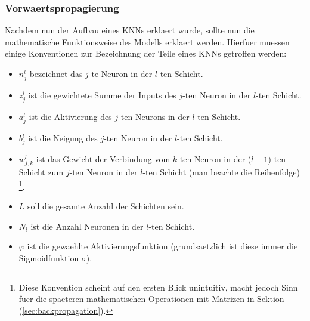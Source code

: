 \documentclass[../main]{subfiles}
\begin{document}
\subsubsection{Vorwaertspropagierung}
Nachdem nun der Aufbau eines KNNs erklaert wurde, sollte nun die mathematische Funktionsweise
des Modells erklaert werden. Hierfuer muessen einige Konventionen zur
Bezeichnung der Teile eines KNNs getroffen werden:

\begin{itemize}

\item{$n_j^l$ bezeichnet das $j$-te Neuron in der $l$-ten Schicht.}
\item{$z_j^l$ ist die gewichtete Summe der Inputs des $j$-ten Neuron in der $l$-ten Schicht.}
\item{$a_j^l$ ist die Aktivierung des $j$-ten Neurons in der $l$-ten Schicht.}
\item{$b_j^l$ ist die Neigung des $j$-ten Neuron in der $l$-ten Schicht.}
\item{$w_{j,k}^l$ ist das Gewicht der Verbindung vom $k$-ten Neuron
    in der ($l-1$)-ten Schicht zum $j$-ten Neuron in der $l$-ten Schicht (man
    beachte die Reihenfolge)
    \footnote{
      Diese Konvention scheint auf den ersten Blick unintuitiv, macht jedoch
      Sinn fuer die spaeteren mathematischen Operationen mit Matrizen in Sektion
      (\ref{sec:backpropagation}).
    }.}

\item{$L$ soll die gesamte Anzahl der Schichten sein.}

\item{$N_l$ ist die Anzahl Neuronen in der $l$-ten Schicht.} 

\item{$\varphi$ ist die gewaehlte Aktivierungsfunktion (grundsaetzlich ist diese
    immer die Sigmoidfunktion $\sigma$).}

\end{itemize}
\end{document}
